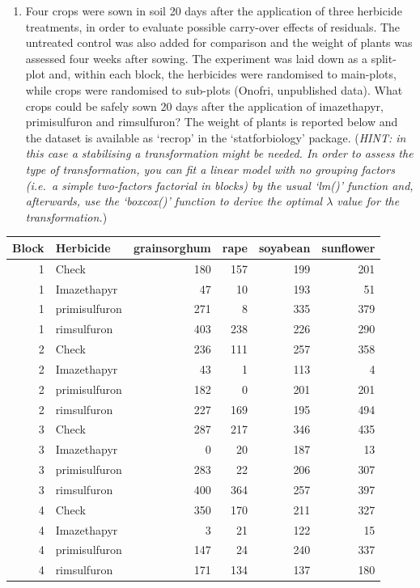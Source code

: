 \documentclass[
  12pt,
]{book}
\providecommand{\tightlist}{%
  \setlength{\itemsep}{0pt}\setlength{\parskip}{0pt}}
\begin{document}
\begin{enumerate}
\def\labelenumi{\arabic{enumi}.}
\setcounter{enumi}{1}
\tightlist
\item
  Four crops were sown in soil 20 days after the application of three herbicide treatments, in order to evaluate possible carry-over effects of residuals. The untreated control was also added for comparison and the weight of plants was assessed four weeks after sowing. The experiment was laid down as a split-plot and, within each block, the herbicides were randomised to main-plots, while crops were randomised to sub-plots (Onofri, unpublished data). What crops could be safely sown 20 days after the application of imazethapyr, primisulfuron and rimsulfuron? The weight of plants is reported below and the dataset is available as `recrop' in the `statforbiology' package. (\emph{HINT: in this case a stabilising a transformation might be needed. In order to assess the type of transformation, you can fit a linear model with no grouping factors (i.e.~a simple two-factors factorial in blocks) by the usual `lm()' function and, afterwards, use the `boxcox()' function to derive the optimal \(\lambda\) value for the transformation.})
\end{enumerate}

\begin{longtable}[]{@{}rlrrrr@{}}
\toprule()
Block & Herbicide & grainsorghum & rape & soyabean & sunflower \\
\midrule()
\endhead
1 & Check & 180 & 157 & 199 & 201 \\
1 & Imazethapyr & 47 & 10 & 193 & 51 \\
1 & primisulfuron & 271 & 8 & 335 & 379 \\
1 & rimsulfuron & 403 & 238 & 226 & 290 \\
2 & Check & 236 & 111 & 257 & 358 \\
2 & Imazethapyr & 43 & 1 & 113 & 4 \\
2 & primisulfuron & 182 & 0 & 201 & 201 \\
2 & rimsulfuron & 227 & 169 & 195 & 494 \\
3 & Check & 287 & 217 & 346 & 435 \\
3 & Imazethapyr & 0 & 20 & 187 & 13 \\
3 & primisulfuron & 283 & 22 & 206 & 307 \\
3 & rimsulfuron & 400 & 364 & 257 & 397 \\
4 & Check & 350 & 170 & 211 & 327 \\
4 & Imazethapyr & 3 & 21 & 122 & 15 \\
4 & primisulfuron & 147 & 24 & 240 & 337 \\
4 & rimsulfuron & 171 & 134 & 137 & 180 \\
\bottomrule()
\end{longtable}
\end{document}
